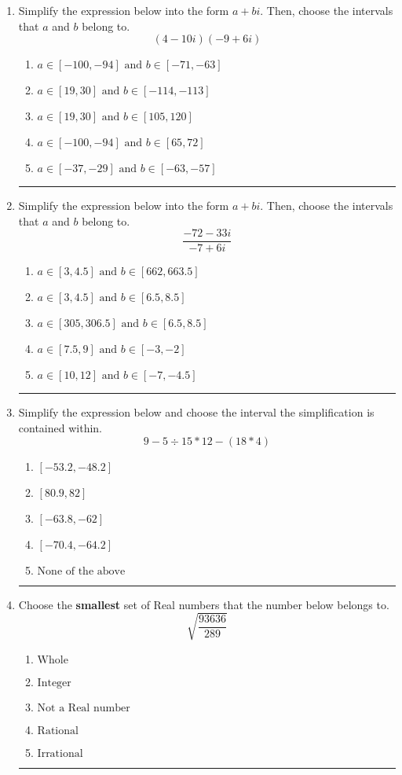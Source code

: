 \documentclass[14pt]{extbook}
\newcommand{\litem}[1]{\item#1\hspace*{-1cm}\rule{\textwidth}{0.4pt}}
\begin{document}
\begin{enumerate}
{\begin{enumerate}[label=\Alph*.]
\end{enumerate} }
\litem{
Simplify the expression below into the form $a+bi$. Then, choose the intervals that $a$ and $b$ belong to.\[ (4 - 10 i)(-9 + 6 i) \]\begin{enumerate}[label=\Alph*.]
\item \( a \in [-100, -94] \text{ and } b \in [-71, -63] \)
\item \( a \in [19, 30] \text{ and } b \in [-114, -113] \)
\item \( a \in [19, 30] \text{ and } b \in [105, 120] \)
\item \( a \in [-100, -94] \text{ and } b \in [65, 72] \)
\item \( a \in [-37, -29] \text{ and } b \in [-63, -57] \)

\end{enumerate} }
\litem{
Simplify the expression below into the form $a+bi$. Then, choose the intervals that $a$ and $b$ belong to.\[ \frac{-72 - 33 i}{-7 + 6 i} \]\begin{enumerate}[label=\Alph*.]
\item \( a \in [3, 4.5] \text{ and } b \in [662, 663.5] \)
\item \( a \in [3, 4.5] \text{ and } b \in [6.5, 8.5] \)
\item \( a \in [305, 306.5] \text{ and } b \in [6.5, 8.5] \)
\item \( a \in [7.5, 9] \text{ and } b \in [-3, -2] \)
\item \( a \in [10, 12] \text{ and } b \in [-7, -4.5] \)

\end{enumerate} }
\litem{
Simplify the expression below and choose the interval the simplification is contained within.\[ 9 - 5 \div 15 * 12 - (18 * 4) \]\begin{enumerate}[label=\Alph*.]
\item \( [-53.2, -48.2] \)
\item \( [80.9, 82] \)
\item \( [-63.8, -62] \)
\item \( [-70.4, -64.2] \)
\item \( \text{None of the above} \)

\end{enumerate} }
\litem{
Choose the \textbf{smallest} set of Real numbers that the number below belongs to.\[ \sqrt{\frac{93636}{289}} \]\begin{enumerate}[label=\Alph*.]
\item \( \text{Whole} \)
\item \( \text{Integer} \)
\item \( \text{Not a Real number} \)
\item \( \text{Rational} \)
\item \( \text{Irrational} \)


\end{enumerate}}
\end{enumerate}
\end{document}
